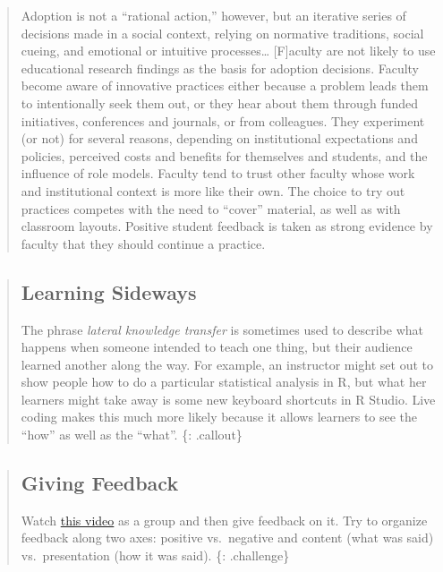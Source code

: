 \begin{quote}
Adoption is not a ``rational action,'' however, but an iterative series
of decisions made in a social context, relying on normative traditions,
social cueing, and emotional or intuitive processes\ldots{}
{[}F{]}aculty are not likely to use educational research findings as the
basis for adoption decisions. Faculty become aware of innovative
practices either because a problem leads them to intentionally seek them
out, or they hear about them through funded initiatives, conferences and
journals, or from colleagues. They experiment (or not) for several
reasons, depending on institutional expectations and policies, perceived
costs and benefits for themselves and students, and the influence of
role models. Faculty tend to trust other faculty whose work and
institutional context is more like their own. The choice to try out
practices competes with the need to ``cover'' material, as well as with
classroom layouts. Positive student feedback is taken as strong evidence
by faculty that they should continue a practice.
\end{quote}

\begin{quote}
\subsection{Learning Sideways}\label{learning-sideways}

The phrase \emph{lateral knowledge transfer} is sometimes used to
describe what happens when someone intended to teach one thing, but
their audience learned another along the way. For example, an instructor
might set out to show people how to do a particular statistical analysis
in R, but what her learners might take away is some new keyboard
shortcuts in R Studio. Live coding makes this much more likely because
it allows learners to see the ``how'' as well as the ``what''. \{:
.callout\}
\end{quote}

\begin{quote}
\subsection{Giving Feedback}\label{giving-feedback}

Watch \href{https://www.youtube.com/watch?v=-ApVt04rB4U}{this video} as
a group and then give feedback on it. Try to organize feedback along two
axes: positive vs.~negative and content (what was said) vs.~presentation
(how it was said). \{: .challenge\}
\end{quote}

